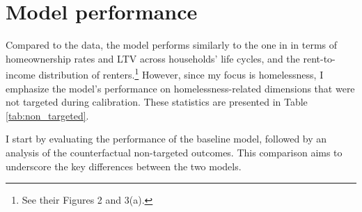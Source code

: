 \documentclass[parskip=full]{article}
\newenvironment{fignote2}[1]
{
\par
\medskip
\begin{minipage}{#1}
\footnotesize
}
{
\end{minipage}
}
\begin{document}
\section{Model performance}\label{sec:model_performance}
Compared to the data, the model performs similarly to the one in \citet{rs-2023} in terms of homeownership rates and LTV across households' life cycles, and the rent-to-income distribution of renters.\footnote{See their Figures 2 and 3(a).} However, since my focus is homelessness, I emphasize the model's performance on homelessness-related dimensions that were not targeted during calibration. These statistics are presented in Table \ref{tab:non_targeted}. 

I start by evaluating the performance of the baseline model, followed by an analysis of the counterfactual non-targeted outcomes. This comparison aims to underscore the key differences between the two models.




\begin{table}[H]
    \centering
    \caption{External calibration}
    \label{tab:external_calibration}
    
    \vspace{-0.5cm}
    \begin{fignote2}{0.8\textwidth}
    \end{fignote2}
\end{table}

\newpage

\begin{table}[H]
    \centering
    \caption{Internal calibration}
    \label{tab:internal_calibration}
    
    \vspace{-0.5cm}
    \begin{fignote2}{0.8\textwidth}
    \end{fignote2}
\end{table}
\end{document}

